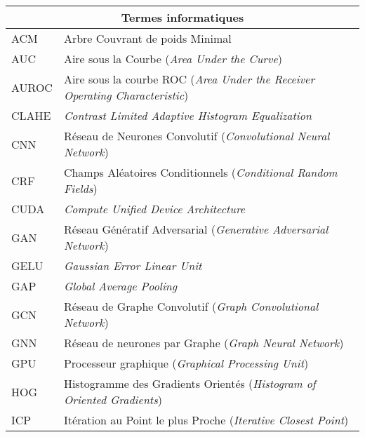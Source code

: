 \begin{longtable}{lp{5in}}
\multicolumn{2}{c}{Termes informatiques} \\
\hline
ACM & Arbre Couvrant de poids Minimal \\ 
AUC & Aire sous la Courbe (\textit{Area Under the Curve}) \\
AUROC & Aire sous la courbe ROC (\textit{Area Under the Receiver Operating Characteristic}) \\
CLAHE & \textit{Contrast Limited Adaptive Histogram Equalization} \\
CNN & Réseau de Neurones Convolutif (\textit{Convolutional Neural Network}) \\
CRF & Champs Aléatoires Conditionnels (\textit{Conditional Random Fields}) \\
CUDA & \textit{Compute Unified Device Architecture} \\
GAN & Réseau Génératif Adversarial (\textit{Generative Adversarial Network})  \\
GELU & \textit{Gaussian Error Linear Unit} \\
GAP & \textit{Global Average Pooling} \\
GCN & Réseau de Graphe Convolutif (\textit{Graph Convolutional Network}) \\
GNN & Réseau de neurones par Graphe (\textit{Graph Neural Network}) \\
GPU & Processeur graphique (\textit{Graphical Processing Unit}) \\
HOG & Histogramme des Gradients Orientés (\textit{Histogram of Oriented Gradients})\\
ICP & Itération au Point le plus Proche (\textit{Iterative Closest Point}) \\ 


\end{longtable}
